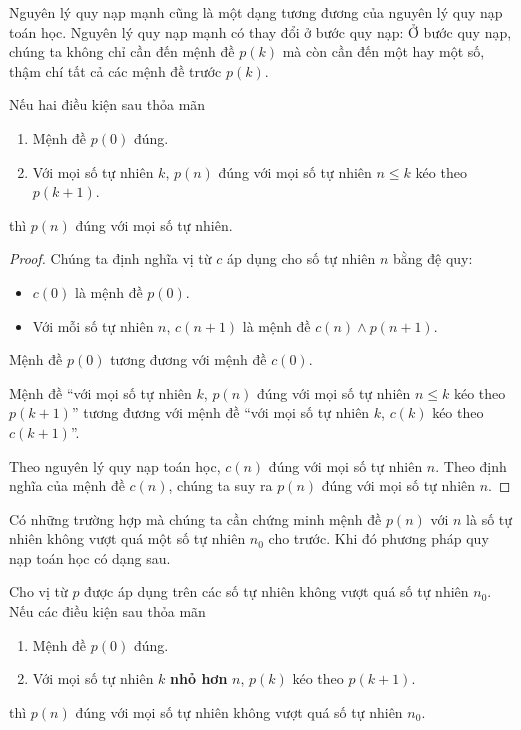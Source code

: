 Nguyên lý quy nạp mạnh cũng là một dạng tương đương của nguyên lý quy nạp toán học. Nguyên lý quy nạp mạnh có thay đổi ở bước quy nạp: Ở bước quy nạp, chúng ta không chỉ cần đến mệnh đề $p(k)$ mà còn cần đến một hay một số, thậm chí tất cả các mệnh đề trước $p(k)$.
\begin{theorem}
    Nếu hai điều kiện sau thỏa mãn
    \begin{enumerate}[label={(\roman*)}]
        \item Mệnh đề $p(0)$ đúng.
        \item Với mọi số tự nhiên $k$, $p(n)$ đúng với mọi số tự nhiên $n\leq k$ kéo theo $p(k+1)$.
    \end{enumerate}

    thì $p(n)$ đúng với mọi số tự nhiên.
\end{theorem}

\begin{proof}
    Chúng ta định nghĩa vị từ $c$ áp dụng cho số tự nhiên $n$ bằng đệ quy:
    \begin{itemize}
        \item $c(0)$ là mệnh đề $p(0)$.
        \item Với mỗi số tự nhiên $n$, $c(n+1)$ là mệnh đề $c(n)\wedge p(n+1)$.
    \end{itemize}

    Mệnh đề $p(0)$ tương đương với mệnh đề $c(0)$.

    Mệnh đề ``với mọi số tự nhiên $k$, $p(n)$ đúng với mọi số tự nhiên $n\leq k$ kéo theo $p(k+1)$'' tương đương với mệnh đề ``với mọi số tự nhiên $k$, $c(k)$ kéo theo $c(k+1)$''.

    Theo nguyên lý quy nạp toán học, $c(n)$ đúng với mọi số tự nhiên $n$. Theo định nghĩa của mệnh đề $c(n)$, chúng ta suy ra $p(n)$ đúng với mọi số tự nhiên $n$.
\end{proof}

Có những trường hợp mà chúng ta cần chứng minh mệnh đề $p(n)$ với $n$ là số tự nhiên không vượt quá một số tự nhiên $n_{0}$ cho trước. Khi đó phương pháp quy nạp toán học có dạng sau.
\begin{theorem}
    Cho vị từ $p$ được áp dụng trên các số tự nhiên không vượt quá số tự nhiên $n_{0}$. Nếu các điều kiện sau thỏa mãn
    \begin{enumerate}[label={(\roman*)}]
        \item Mệnh đề $p(0)$ đúng.
        \item Với mọi số tự nhiên $k$ \textbf{nhỏ hơn} $n$, $p(k)$ kéo theo $p(k+1)$.
    \end{enumerate}

    thì $p(n)$ đúng với mọi số tự nhiên không vượt quá số tự nhiên $n_{0}$.
\end{theorem}

